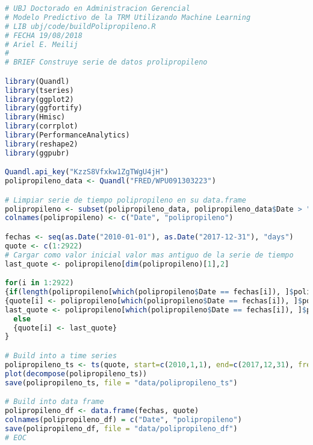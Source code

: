 \begin{lstlisting}[language=R]
# UBJ Doctorado en Administracion Gerencial
# Modelo Predictivo de la TRM Utilizando Machine Learning
# LIB ubj/code/buildPolipropileno.R
# FECHA 19/08/2018
# Ariel E. Meilij
#
# BRIEF Construye serie de datos prolipropileno

library(Quandl)
library(tseries)
library(ggplot2)
library(ggfortify)
library(Hmisc)
library(corrplot)
library(PerformanceAnalytics)
library(reshape2)
library(ggpubr)

Quandl.api_key("KzzS8Vfxkw1ZgTWgU4jH")
polipropileno_data <- Quandl("FRED/WPU091303223")

# Limpiar serie de tiempo polipropileno en su data.frame
polipropileno <- subset(polipropileno_data, polipropileno_data$Date > "2009-12-31")
colnames(polipropileno) <- c("Date", "polipropileno")

fechas <- seq(as.Date("2010-01-01"), as.Date("2017-12-31"), "days")
quote <- c(1:2922)
# Cargar como valor inicial valor mas antiguo de la serie de tiempo
last_quote <- polipropileno[dim(polipropileno)[1],2]

for(i in 1:2922)
{if(length(polipropileno[which(polipropileno$Date == fechas[i]), ]$polipropileno))
{quote[i] <- polipropileno[which(polipropileno$Date == fechas[i]), ]$polipropileno
last_quote <- polipropileno[which(polipropileno$Date == fechas[i]), ]$polipropileno}
  else
  {quote[i] <- last_quote}
}

# Build into a time series
polipropileno_ts <- ts(quote, start=c(2010,1,1), end=c(2017,12,31), frequency=365)
plot(decompose(polipropileno_ts))
save(polipropileno_ts, file = "data/polipropileno_ts")

# Build into data frame
polipropileno_df <- data.frame(fechas, quote)
colnames(polipropileno_df) = c("Date", "polipropileno")
save(polipropileno_df, file = "data/polipropileno_df")
# EOC
\end{lstlisting}

